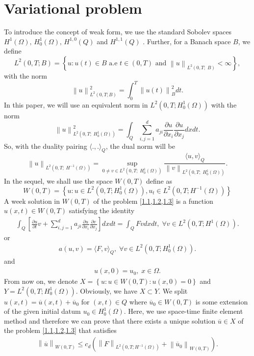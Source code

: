 \documentclass[]{article}
\begin{document}
\section{Variational problem}\label{section2}
To introduce the concept of weak form, we use the standard Sobolev spaces $H^1(\Omega),\, H^1_0(\Omega),\, H^{1, 0}(Q)$ and $H^{1, 1}(Q)$ \cite{b1, b2, b3}. Further, for a Banach space $B$, we define
$$L^2(0, T; B)=\left\{u:u(t)\in B \text{ a.e } t\in (0, T) \text{ and } \left\|u\right\|_{L^2(0, T;\; B)} <\infty \right\},$$
with the norm
$$\left\|u\right\|_{L^2(0, T; B)}^2=\int_0^T\left\|u(t)\right\|^2_Bdt.$$
In this paper, we will use an equivalent norm in $L^2\left(0, T; H^1_0(\Omega)\right)$ with the norm
$$\left\|u\right\|_{L^2(0, T;\; H^1_0(\Omega))}^2=\int_Q \sum_{i, j=1}^{d}a_{ji}\frac{\partial u}{\partial x_i}\frac{\partial u}{\partial x_j}dxdt.$$
So, with the duality pairing $\langle ., .\rangle_Q$, the dual norm will be
$$\left\|u\right\|_{L^2(0, T;\; H^{-1}(\Omega))}=\sup_{0\neq v\in L^2(0, T;\; H^1_0(\Omega))}\frac{\langle u, v\rangle_Q}{\left\|v\right\|_{L^2(0, T;\; H^1_0(\Omega))}}.$$
In the sequel, we shall use the space $W(0, T)$ define as
$$W(0, T)=\left\{u: u\in L^2(0, T; H^1_0(\Omega)), u_t\in L^2\left(0, T; H^{-1}(\Omega) \right)\right\}$$
A week solution in $W(0, T)$ of the problem \cref{1.1,1.2,1.3} is a function $u(x, t)\in W(0, T)$ satisfying the identity
\begin{align}\label{2.1}
	\int_{Q}\left[\frac{\partial u}{\partial t}v+\sum_{i, j=1}^{d}a_{ji}\frac{\partial u}{\partial x_i}\frac{\partial v}{\partial x_j}\right]dxdt=\int_{Q}Fvdxdt,\;\forall v \in L^2\left(0, T; H^1(\Omega)\right).
\end{align}
or 
\begin{align*}
	a(u, v)=\langle F, v\rangle_{Q},\;\forall v \in L^2\left(0, T; H^1_0(\Omega)\right).
\end{align*}
and 
\begin{align}\label{2.2}
	u(x, 0)=u_0,\; x\in \Omega.
\end{align}
From now on, we denote $X=\left\{u: u\in W(0, T): u(x, 0)=0\right\}$ and $Y=L^2\left(0, T; H^1_0(\Omega)\right)$. Obviously, we have $X\subset Y$. We split $u(x, t)=\overline{u}(x, t)+\overline{u}_0$ for $(x, t)\in Q$ where $\overline{u}_0\in W(0, T)$ is some extension of the given initial datum $u_0\in H^1_0(\Omega)$. Here, we use space-time finite element method \cite{a16} and therefore we can prove that there exists a unique solution $\overline{u}\in X$ of the problem \cref{1.1,1.2,1.3} that satisfies 
\begin{align}\label{2.3}
	\left\|\overline{u}\right\|_{W(0, T)} \leq c_d \left(\left\|F\right\|_{L^2\left(0, T; H^{-1}(\Omega)\right)}+\left\|\overline{u}_0\right\|_{W(0, T)}\right).
\end{align}
\end{document}

